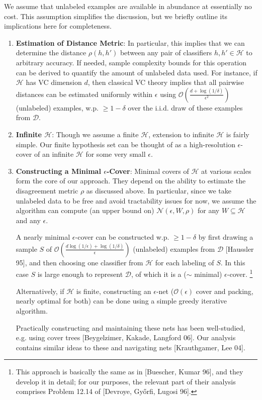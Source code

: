 \documentclass{article}[12pt]
\theoremstyle{named}
\newcommand{\cH}{\mathcal{H}}
\newcommand{\cD}{\mathcal{D}}
\newcommand{\cN}{\mathcal{N}}
\newcommand{\cO}[1]{\mathcal{O}\left(#1\right)}
\begin{document}
We assume that unlabeled examples are available in abundance at essentially no cost. 
This assumption simplifies the discussion, but we briefly outline its implications here for completeness.

\begin{enumerate}
\item
\textbf{Estimation of Distance Metric}:  
In particular, this implies that we can determine the distance $\rho(h, h')$ 
between any pair of classifiers $h, h' \in \cH$ to arbitrary accuracy. 
If needed, sample complexity bounds for this operation can be derived to quantify the amount of unlabeled data used. 
For instance, if $\cH$ has VC dimension $d$, then classical VC theory implies that all pairwise distances 
can be estimated uniformly within $\epsilon$ using $\cO{ \frac{d + \log (1/\delta)}{\epsilon^{2}} }$ (unlabeled) examples, 
w.p. $\geq 1-\delta$ over the i.i.d. draw of these examples from $\cD$. 

\item
\textbf{Infinite $\cH$}: 
Though we assume a finite $\cH$, 
extension to infinite $\cH$ is fairly simple.
Our finite hypothesis set can be thought of as a high-resolution $\epsilon$-cover of 
an infinite $\cH$ for some very small $\epsilon$. 

\item
\textbf{Constructing a Minimal $\epsilon$-Cover}: 
Minimal covers of $\cH$ at various scales form the core of our approach. 
They depend on the ability to estimate the disagreement metric $\rho$ as discussed above. 
In particular, since we take unlabeled data to be free and avoid tractability issues for now, 
we assume the algorithm can compute (an upper bound on) $\cN (\epsilon, W, \rho)$ 
for any $W \subseteq \cH$ and any $\epsilon$.

A nearly minimal $\epsilon$-cover can be constructed w.p. $\geq 1-\delta$ 
by first drawing a sample $S$ of 
$\cO{ \frac{d \log (1/\epsilon) + \log (1/\delta)}{\epsilon} }$ (unlabeled) examples from $\cD$ [Haussler 95], 
and then choosing one classifier from $\cH$ for each labeling of $S$.
In this case $S$ is large enough to represent $\cD$, of which it is a ($\sim$ minimal) $\epsilon$-cover. 
\footnote{This approach is basically the same as in [Buescher, Kumar 96], 
and they develop it in detail; 
for our purposes, the relevant part of their analysis comprises Problem 12.14 of [Devroye, Gy\H{o}rfi, Lugosi 96].}

Alternatively, if $\cH$ is finite, 
constructing an $\epsilon$-net ($\cO{\epsilon}$ cover and packing, nearly optimal for both) 
can be done using a simple greedy iterative algorithm. 

Practically constructing and maintaining these nets has been well-studied, e.g. using cover trees [Beygelzimer, Kakade, Langford 06]. 
Our analysis contains similar ideas to these and navigating nets [Krauthgamer, Lee 04].
\end{enumerate}
\end{document}
